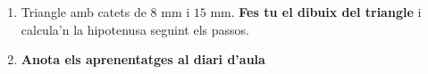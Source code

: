 \documentclass[12pt,a4paper]{article}
\begin{document}
\begin{enumerate}
    \item Triangle amb catets de $8\text{ mm}$ i $15\text{ mm}$. \textbf{Fes tu el dibuix del triangle} i calcula'n la hipotenusa seguint els passos.
    \vspace{4.5cm}

    \item \textbf{Anota els aprenentatges al diari d'aula}
\end{enumerate}
\end{document}
